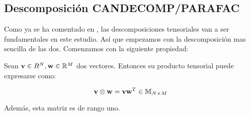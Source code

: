 \subsection{Descomposición CANDECOMP/PARAFAC}

Como ya se ha comentado en , las descomposiciones tensoriales van a ser fundamentales en este estudio. Así que empezamos con la descomposición mas sencilla de las dos. Comenzamos con la siguiente propiedad:

\begin{proposicion}
    Sean $\mathbf{v} \in R^{N}, \mathbf{w} \in \mathbb{R}^{M}$ dos vectores. Entonces su producto tensorial puede expresarse como:

    $$\mathbf{v} \otimes \mathbf{w} = \mathbf{v} \mathbf{w}^T \in \mathbb{M}_{N \times M}$$

    Además, esta matriz es de rango uno.
\end{proposicion}


